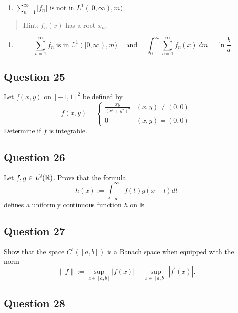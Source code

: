 \documentclass[12pt]{article}
\providecommand{\tightlist}{%
  \setlength{\itemsep}{0pt}\setlength{\parskip}{0pt}}
\begin{document}
\begin{enumerate}
\def\labelenumi{\alph{enumi}.}
\tightlist
\item
  \(\sum_{n=1}^{\infty}\left|f_{n}\right| \text { is not in } L^{1}([0, \infty), m)\)
\end{enumerate}

\begin{quote}
Hint: \(f_n(x)\) has a root \(x_n\).
\end{quote}

\begin{enumerate}
\def\labelenumi{\alph{enumi}.}
\setcounter{enumi}{1}
\tightlist
\item
  \[
  \sum_{n=1}^{\infty} f_{n} \text { is in } L^{1}([0, \infty), m) 
  \quad \text { and } \quad 
  \int_{0}^{\infty} \sum_{n=1}^{\infty} f_{n}(x) ~d m=\ln \frac{b}{a}
  \]
\end{enumerate}

\hypertarget{question-25-1}{%
\subsection{Question 25}\label{question-25-1}}

Let \(f(x, y)\) on \([-1, 1]^2\) be defined by \[
f(x, y) = \begin{cases}
\frac{x y}{\left(x^{2}+y^{2}\right)^{2}} & (x, y) \neq (0, 0) \\
0 & (x, y) = (0, 0)
\end{cases}
\] Determine if \(f\) is integrable.

\hypertarget{question-26-1}{%
\subsection{Question 26}\label{question-26-1}}

Let \(f, g \in L^2({\mathbb{R}})\). Prove that the formula \[
h(x):=\int_{-\infty}^{\infty} f(t) g(x-t) d t
\] defines a uniformly continuous function \(h\) on \({\mathbb{R}}\).

\hypertarget{question-27-1}{%
\subsection{Question 27}\label{question-27-1}}

Show that the space \(C^1([a, b])\) is a Banach space when equipped with
the norm \[
\|f\|:=\sup _{x \in[a, b]}|f(x)|+\sup _{x \in[a, b]}\left|f^{\prime}(x)\right|.
\]

\hypertarget{question-28-1}{%
\subsection{Question 28}\label{question-28-1}}
\end{document}
